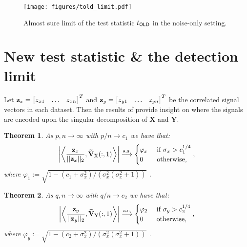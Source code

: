 \documentclass[conference]{IEEEtran}
\newcommand{\X}{\mathbf{X}}
\newcommand{\Y}{\mathbf{Y}}
\newcommand{\Vxt}{\widetilde{{\mathbf{V}}}_{{\rm X}}}
\newcommand{\Vyt}{\widetilde{{\mathbf{V}}}_{{\rm Y}}}
\newcommand{\convas}{\overset{\textrm{a.s.}}{\longrightarrow}}
\newtheorem{Th}{Theorem}[section]
\begin{document}
\begin{figure}
\centering
\texttt{[image: figures/told\_limit.pdf]}
\caption{Almost sure limit of the test statistic $t_{{\sf OLD}}$ in the noise-only setting.}
\label{fig:told limit}
\vspace{-0.5cm}
\end{figure}

\section{New test statistic \&  the detection limit}\label{sec:fun limit}

Let ${\bf z}_{x} = \begin{bmatrix} z_{x1} & \ldots & z_{xn} \end{bmatrix}^{T}$ and ${\bf z}_{y} = \begin{bmatrix} z_{y1} & \ldots & z_{yn} \end{bmatrix}^{T}$ be the correlated signal vectors in each dataset. Then the results of \cite{benaych2009eigenvalues} provide insight on where the signals are encoded upon the singular decomposition of $\X$ and $\Y$.

\flushleft \begin{Th}\label{th:right sing vector 1}
As $p,n \longrightarrow \infty$ with $p/n \to c_1$ we have that:
$$ \left| \left\langle \dfrac{{\bf z}_{x}}{||{\bf z}_{x}||_{2}}, \Vxt(:,1) \right\rangle \right| \convas
\begin{cases}
\varphi_{x} &\textrm{ if } \sigma_{x} > c_{1}^{1/4}\\
0 &\textrm{ otherwise,}\end{cases},$$
where $\varphi_{1}:=\sqrt{1 - (c_1 +\sigma_x^{2})/(\sigma_x^{2}(\sigma_x^{2} +1 ))}$ \cite{benaych2009eigenvalues}.
\end{Th}

\flushleft \begin{Th}\label{th:right sing vector 2}
As $q,n \longrightarrow \infty$ with $q/n \to c_2$ we have that:
$$ \left| \left\langle \dfrac{{\bf z}_{y}}{||{\bf z}_{y}||_{2}}, \Vyt(:,1) \right\rangle \right| \convas
\begin{cases}
\varphi_{2} &\textrm{ if } \sigma_{y} > c_{2}^{1/4}\\
0 &\textrm{ otherwise,}\end{cases},$$
where $\varphi_{y}:=\sqrt{1 - (c_2 +\sigma_x^{2})/(\sigma_x^{2}(\sigma_x^{2} +1 ))}$ \cite{benaych2009eigenvalues}.
\end{Th}
\end{document}
